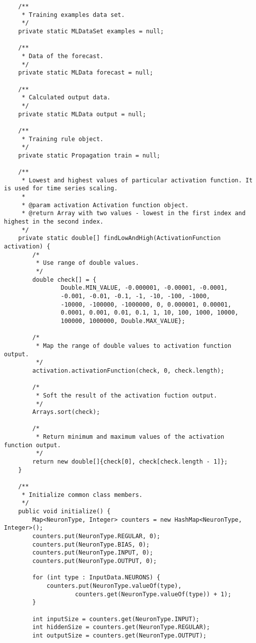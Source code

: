\begin{verbatim}
    /**
     * Training examples data set.
     */
    private static MLDataSet examples = null;

    /**
     * Data of the forecast.
     */
    private static MLData forecast = null;

    /**
     * Calculated output data.
     */
    private static MLData output = null;

    /**
     * Training rule object.
     */
    private static Propagation train = null;

    /**
     * Lowest and highest values of particular activation function. It is used for time series scaling.
     *
     * @param activation Activation function object.
     * @return Array with two values - lowest in the first index and highest in the second index.
     */
    private static double[] findLowAndHigh(ActivationFunction activation) {
        /*
         * Use range of double values.
         */
        double check[] = {
                Double.MIN_VALUE, -0.000001, -0.00001, -0.0001,
                -0.001, -0.01, -0.1, -1, -10, -100, -1000,
                -10000, -100000, -1000000, 0, 0.000001, 0.00001,
                0.0001, 0.001, 0.01, 0.1, 1, 10, 100, 1000, 10000,
                100000, 1000000, Double.MAX_VALUE};

        /*
         * Map the range of double values to activation function output.
         */
        activation.activationFunction(check, 0, check.length);

        /*
         * Soft the result of the activation fuction output.
         */
        Arrays.sort(check);

        /*
         * Return minimum and maximum values of the activation function output.
         */
        return new double[]{check[0], check[check.length - 1]};
    }

    /**
     * Initialize common class members.
     */
    public void initialize() {
        Map<NeuronType, Integer> counters = new HashMap<NeuronType, Integer>();
        counters.put(NeuronType.REGULAR, 0);
        counters.put(NeuronType.BIAS, 0);
        counters.put(NeuronType.INPUT, 0);
        counters.put(NeuronType.OUTPUT, 0);

        for (int type : InputData.NEURONS) {
            counters.put(NeuronType.valueOf(type),
                    counters.get(NeuronType.valueOf(type)) + 1);
        }

        int inputSize = counters.get(NeuronType.INPUT);
        int hiddenSize = counters.get(NeuronType.REGULAR);
        int outputSize = counters.get(NeuronType.OUTPUT);


\end{verbatim}
